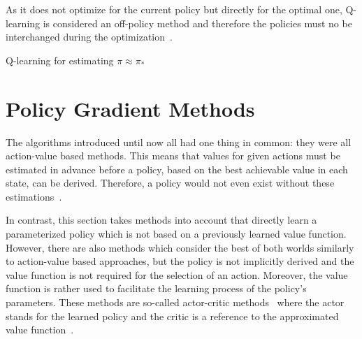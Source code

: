 \documentclass[draft,final]{vutinfth} %
\newcommand{\p}[1]{see p. #1}
\begin{document}
    As it does not optimize for the current policy but directly for the optimal one, Q-learning is considered an off-policy method and therefore the policies must no be interchanged during the optimization~\citep[\p{57}]{szepesvari_algorithms_2010}.

    \begin{algorithm}[H]
        \caption[Q-learning for estimating $\pi \approx \pi_*$]{Q-learning for estimating $\pi \approx \pi_*$\protect\footnotemark}
        \label{alg:q_learning}

        \KwIn{Step size $\alpha \in (0,1]$, small $\epsilon > 0$}
        \;

    \end{algorithm}

    \footnotetext{\citep[\p{131}]{sutton_reinforcement_2018}}


    \section{Policy Gradient Methods}\label{sec:policy-gradient-methods}
    The algorithms introduced until now all had one thing in common: they were all action-value based methods.
    This means that values for given actions must be estimated in advance before a policy, based on the best achievable value in each state, can be derived.
    Therefore, a policy would not even exist without these estimations~\citep[\p{321}]{sutton_reinforcement_2018}.

    In contrast, this section takes methods into account that directly learn a parameterized policy which is not based on a previously learned value function.
    However, there are also methods which consider the best of both worlds similarly to action-value based approaches, but the policy is not implicitly derived and the value function is not required for the selection of an action.
    Moreover, the value function is rather used to facilitate the learning process of the policy's parameters.
    These methods are so-called actor-critic methods~ where the actor stands for the learned policy and the critic is a reference to the approximated value function~\citep[\p{321}]{sutton_reinforcement_2018}.
\end{document}
